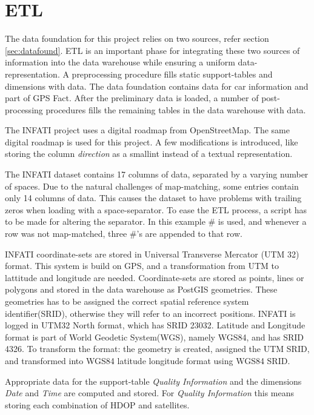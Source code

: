 \section{ETL}\label{sec:ETL}
The data foundation for this project relies on two sources, refer section \ref{sec:datafound}. ETL is an important phase for integrating these two sources of information into the data warehouse while ensuring a uniform data-representation. A preprocessing procedure fills static support-tables and dimensions with data. The data foundation contains data for car information and part of GPS Fact. After the preliminary data is loaded, a number of post-processing procedures fills the remaining tables in the data warehouse with data.

The INFATI project\cite{art:INFATI} uses a digital roadmap from OpenStreetMap\cite{osm}. The same digital roadmap is used for this project. A few modifications is introduced, like storing the column \textit{direction} as a smallint instead of a textual representation. 

The INFATI dataset\cite{art:INFATI} contains 17 columns of data, separated by a varying number of spaces. Due to the natural challenges of map-matching, some entries contain only 14 columns of data. This causes the dataset to have problems with trailing zeros when loading with a space-separator. To ease the ETL process, a script has to be made for altering the separator. In this example \# is used, and whenever a row was not map-matched, three \#'s are appended to that row.

INFATI coordinate-sets are stored in Universal Transverse Mercator (UTM 32) format. This system is build on GPS, and a transformation from UTM to lattitude and longitude are needed. Coordinate-sets are stored as points, lines or polygons and stored in the data warehouse as PostGIS\cite{postgis} geometries. These geometries has to be assigned the correct spatial reference system identifier(SRID), otherwise they will refer to an incorrect positions. INFATI is logged in UTM32 North format, which has SRID 23032\cite{UTM32N}. Latitude and Longitude format is part of World Geodetic System(WGS), namely WGS84, and has SRID 4326\cite{WGS84}. To transform the format: the geometry is created, assigned the UTM SRID, and transformed into WGS84 latitude longitude format using WGS84 SRID. 

Appropriate data for the support-table \textit{Quality Information} and the dimensions \textit{Date} and \textit{Time} are computed and stored. For \textit{Quality Information} this means storing each combination of HDOP and satellites.

